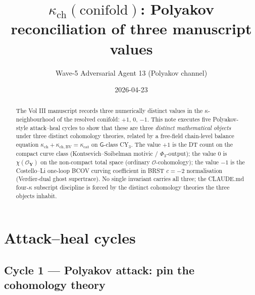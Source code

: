 \documentclass[11pt]{amsart}
\theoremstyle{definition}
\providecommand{\bY}{\mathbf{Y}}
\providecommand{\cO}{\mathcal{O}}
\begin{document}
\title{$\kappa_{\mathrm{ch}}(\mathrm{conifold})$: Polyakov reconciliation
of three manuscript values}
\author{Wave-5 Adversarial Agent 13 (Polyakov channel)}
\date{2026-04-23}

\maketitle

\begin{abstract}
The Vol III manuscript records three numerically distinct values in
the $\kappa$-neighbourhood of the resolved conifold:
$+1$, $0$, $-1$. This note executes five Polyakov-style attack--heal
cycles to show that these are three \emph{distinct mathematical
objects} under three distinct cohomology theories, related by a
free-field chain-level balance equation
$\kappa_{\mathrm{ch}} + \kappa_{\mathrm{ch,BV}} = \kappa_{\mathrm{cat}}$
on $\mathsf G$-class CY$_3$. The value $+1$ is the DT count on the
compact curve class (Kontsevich--Soibelman motivic / $\Phi_3$-output);
the value $0$ is $\chi(\cO_\bY)$ on the non-compact total space
(ordinary $\cO$-cohomology); the value $-1$ is the Costello--Li
one-loop BCOV curving coefficient in BRST $c = -2$ normalisation
(Verdier-dual ghost supertrace). No single invariant carries all
three; the CLAUDE.md four-$\kappa$ subscript discipline is forced by
the distinct cohomology theories the three objects inhabit.
\end{abstract}

\section*{Attack--heal cycles}

\subsection*{Cycle 1 --- Polyakov attack: pin the cohomology theory}
\end{document}
